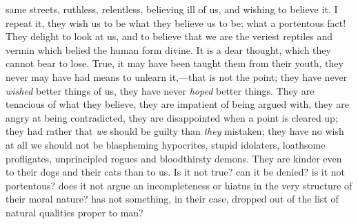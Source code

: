 same streets, ruthless, relentless, believing ill of us,
and wishing to believe it. I repeat it, they wish us to
be what they believe us to be; what a portentous fact!
They delight to look at us, and to believe that we are
the veriest reptiles and vermin which belied the human
form divine. It is a dear thought, which they cannot bear
to lose. True, it may have been taught them from their
youth, they never may have had means to unlearn
it,—that is not the point; they have never \emph{wished}
better things of us, they have never \emph{hoped}
better things. They are tenacious of what they believe,
they are impatient of being argued with, they are angry
at being contradicted, they are disappointed when a point
is cleared up; they had rather that \emph{we} should be
guilty than \emph{they} mistaken; they have no wish at
all we should not be blaspheming hypocrites, stupid
idolaters, loathsome profligates, unprincipled rogues and
bloodthirsty demons. They are kinder even to their dogs
and their cats than to us. Is it not true? can it be
denied? is it not portentous? does it not argue an
incompleteness or hiatus in the very structure of their
moral nature? has not something, in their case, dropped
out of the list of natural qualities proper to man?


